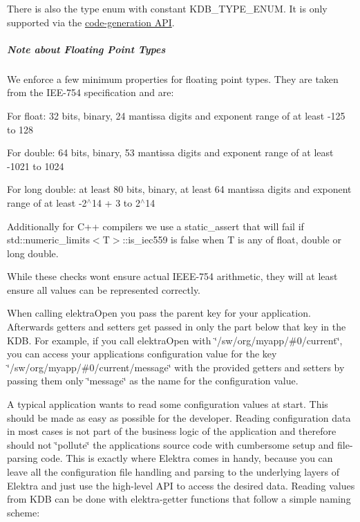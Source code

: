 There is also the type {\ttfamily enum} with constant {\ttfamily K\+D\+B\+\_\+\+T\+Y\+P\+E\+\_\+\+E\+N\+UM}. It is only supported via the \hyperlink{doc_help_elektra-highlevel-gen_md}{code-\/generation A\+PI}.

\label{invalid_invalid}%
%
\subparagraph*{Note about Floating Point Types}

We enforce a few minimum properties for floating point types. They are taken from the I\+E\+E-\/754 specification and are\+:


\begin{DoxyItemize}
\item For {\ttfamily float}\+: 32 bits, binary, 24 mantissa digits and exponent range of at least -\/125 to 128
\item For {\ttfamily double}\+: 64 bits, binary, 53 mantissa digits and exponent range of at least -\/1021 to 1024
\item For {\ttfamily long double}\+: at least 80 bits, binary, at least 64 mantissa digits and exponent range of at least -\/2$^\wedge$14 + 3 to 2$^\wedge$14
\end{DoxyItemize}

Additionally for C++ compilers we use a {\ttfamily static\+\_\+assert} that will fail if {\ttfamily std\+::numeric\+\_\+limits$<$T$>$\+::is\+\_\+iec559} is {\ttfamily false} when {\ttfamily T} is any of {\ttfamily float}, {\ttfamily double} or {\ttfamily long double}.

While these checks won\textquotesingle{}t ensure actual I\+E\+E\+E-\/754 arithmetic, they will at least ensure all values can be represented correctly.

\label{_reading-and-writing-values}%


When calling {\ttfamily elektra\+Open} you pass the parent key for your application. Afterwards getters and setters get passed in only the part below that key in the K\+DB. For example, if you call {\ttfamily elektra\+Open} with {\ttfamily \char`\"{}/sw/org/myapp/\#0/current\char`\"{}}, you can access your applications configuration value for the key {\ttfamily \char`\"{}/sw/org/myapp/\#0/current/message\char`\"{}} with the provided getters and setters by passing them only {\ttfamily \char`\"{}message\char`\"{}} as the name for the configuration value.

\label{_read-values-from-the-kdb}%


A typical application wants to read some configuration values at start. This should be made as easy as possible for the developer. Reading configuration data in most cases is not part of the business logic of the application and therefore should not \char`\"{}pollute\char`\"{} the applications source code with cumbersome setup and file-\/parsing code. This is exactly where Elektra comes in handy, because you can leave all the configuration file handling and parsing to the underlying layers of Elektra and just use the high-\/level A\+PI to access the desired data. Reading values from K\+DB can be done with elektra-\/getter functions that follow a simple naming scheme\+:

